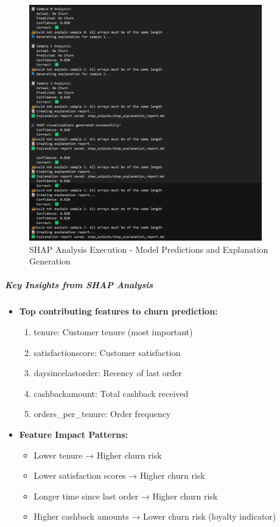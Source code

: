 \documentclass{article}
\begin{document}
\begin{figure}[H]
    \centering
    \includegraphics[width=0.9\textwidth]{Shap_image.png}
    \caption{SHAP Analysis Execution - Model Predictions and Explanation Generation}
    \label{fig:shap_execution}
\end{figure}

\subparagraph{Key Insights from SHAP Analysis}
\begin{itemize}
    \item \textbf{Top contributing features to churn prediction:}
    \begin{enumerate}
        \item tenure: Customer tenure (most important)
        \item satisfactionscore: Customer satisfaction
        \item daysincelastorder: Recency of last order
        \item cashbackamount: Total cashback received
        \item orders\_per\_tenure: Order frequency
    \end{enumerate}
    \item \textbf{Feature Impact Patterns:}
    \begin{itemize}
        \item Lower tenure → Higher churn risk
        \item Lower satisfaction scores → Higher churn risk
        \item Longer time since last order → Higher churn risk
        \item Higher cashback amounts → Lower churn risk (loyalty indicator)
    \end{itemize}
\end{itemize}
\end{document}

